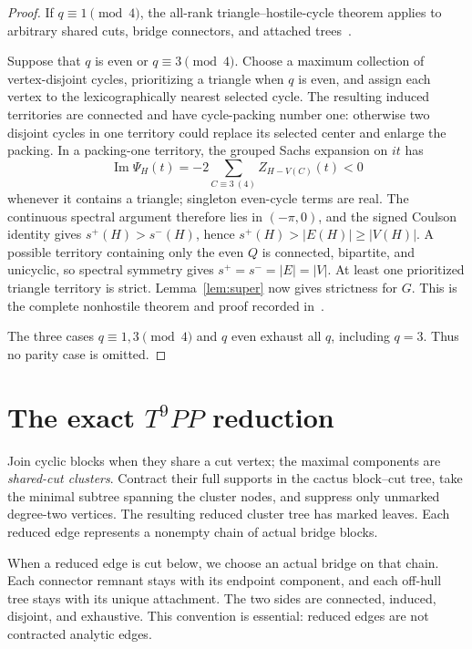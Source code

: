 \documentclass[11pt]{article}
\theoremstyle{remark}
\newcommand{\spE}{s^+}
\newcommand{\smE}{s^-}
\begin{document}
\begin{proof}
If $q\equiv1\pmod4$, the all-rank triangle--hostile-cycle theorem applies to
arbitrary shared cuts, bridge connectors, and attached trees~\cite{Hostile}.

Suppose that $q$ is even or $q\equiv3\pmod4$.  Choose a maximum collection of
vertex-disjoint cycles, prioritizing a triangle when $q$ is even, and assign
each vertex to the lexicographically nearest selected cycle.  The resulting
induced territories are connected and have cycle-packing number one: otherwise
two disjoint cycles in one territory could replace its selected center and
enlarge the packing.  In a packing-one territory, the grouped Sachs expansion
on $it$ has
\[
 \operatorname{Im}\Psi_H(t)=
 -2\sum_{C\equiv3\ (4)}Z_{H-V(C)}(t)<0
\]
whenever it contains a triangle; singleton even-cycle terms are real.  The
continuous spectral argument therefore lies in $(-\pi,0)$, and the signed
Coulson identity gives $\spE(H)>\smE(H)$, hence
$\spE(H)>|E(H)|\geq|V(H)|$.  A possible territory containing only the even
$Q$ is connected, bipartite, and unicyclic, so spectral symmetry gives
$\spE=\smE=|E|=|V|$.  At least one prioritized triangle territory is strict.
Lemma~\ref{lem:super} now gives strictness for $G$.  This is the complete
nonhostile theorem and proof recorded in~\cite{Nonhostile}.

The three cases $q\equiv1,3\pmod4$ and $q$ even exhaust all $q$, including
$q=3$.  Thus no parity case is omitted.
\end{proof}

\section{The exact \texorpdfstring{$T^9PP$}{T9PP} reduction}

Join cyclic blocks when they share a cut vertex; the maximal components are
\emph{shared-cut clusters}.  Contract their full supports in the cactus
block--cut tree, take the minimal subtree spanning the cluster nodes, and
suppress only unmarked degree-two vertices.  The resulting reduced cluster
tree has marked leaves.  Each reduced edge represents a nonempty chain of
actual bridge blocks.

When a reduced edge is cut below, we choose an actual bridge on that chain.
Each connector remnant stays with its endpoint component, and each off-hull
tree stays with its unique attachment.  The two sides are connected, induced,
disjoint, and exhaustive.  This convention is essential: reduced edges are not
contracted analytic edges.
\end{document}
